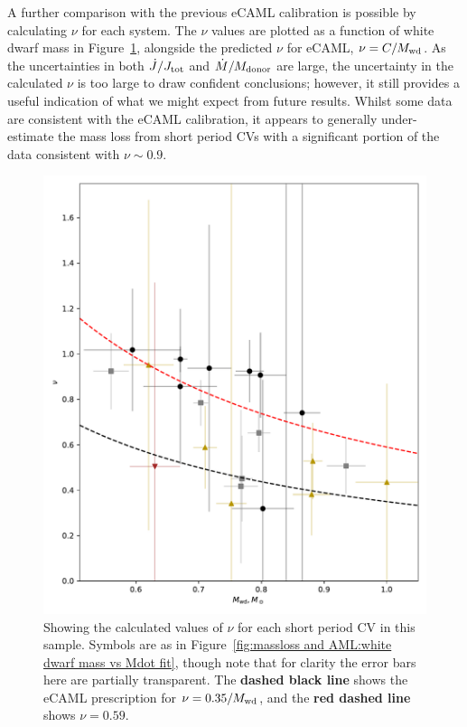 A further comparison with the previous eCAML calibration is possible by calculating $\nu$ for each system.
The $\nu$ values are plotted as a function of white dwarf mass in Figure~\ref{fig:massloss and AML:calculated nu for all short period CVs}, alongside the predicted $\nu$ for eCAML, $\nu = C / M_{\rm wd}$.
As the uncertainties in both $\dot J/J_{\rm tot}$ and $\dot M / M_{\rm donor}$ are large, the uncertainty in the calculated $\nu$ is too large to draw confident conclusions; however, it still provides a useful indication of what we might expect from future results.
Whilst some data are consistent with the \citet{Schreiber2016} eCAML calibration, it appears to generally under-estimate the mass loss from short period CVs with a significant portion of the data consistent with $\nu \sim 0.9$.
\begin{figure}
    \centering
    \includegraphics[width=\textwidth]{figures/results/Mdot/nu_for_each_system.pdf}
    \caption{Showing the calculated values of $\nu$ for each short period CV in this sample. Symbols are as in Figure~\ref{fig:massloss and AML:white dwarf mass vs Mdot fit}, though note that for clarity the error bars here are partially transparent. The {\bf dashed black line} shows the eCAML prescription for $\nu = 0.35 / M_{\rm wd}$, and the {\bf red dashed line} shows $\nu = 0.59$.}
    \label{fig:massloss and AML:calculated nu for all short period CVs}
\end{figure}


